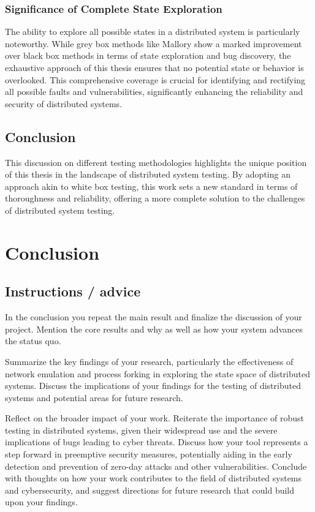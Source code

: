 \documentclass[a4paper,11pt,oneside]{report}
\begin{document}
\subsection{Significance of Complete State Exploration}
The ability to explore all possible states in a distributed system is particularly noteworthy. While grey box methods like Mallory show a marked improvement over black box methods in terms of state exploration and bug discovery, the exhaustive approach of this thesis ensures that no potential state or behavior is overlooked. This comprehensive coverage is crucial for identifying and rectifying all possible faults and vulnerabilities, significantly enhancing the reliability and security of distributed systems.

\section{Conclusion}
This discussion on different testing methodologies highlights the unique position of this thesis in the landscape of distributed system testing. By adopting an approach akin to white box testing, this work sets a new standard in terms of thoroughness and reliability, offering a more complete solution to the challenges of distributed system testing.



\chapter{Conclusion}

\section{Instructions / advice}
In the conclusion you repeat the main result and finalize the discussion of
your project. Mention the core results and why as well as how your system
advances the status quo.

Summarize the key findings of your research, particularly the effectiveness of network emulation and process forking in exploring the state space of distributed systems. Discuss the implications of your findings for the testing of distributed systems and potential areas for future research.

Reflect on the broader impact of your work. Reiterate the importance of robust testing in distributed systems, given their widespread use and the severe implications of bugs leading to cyber threats. Discuss how your tool represents a step forward in preemptive security measures, potentially aiding in the early detection and prevention of zero-day attacks and other vulnerabilities. Conclude with thoughts on how your work contributes to the field of distributed systems and cybersecurity, and suggest directions for future research that could build upon your findings.
\end{document}

